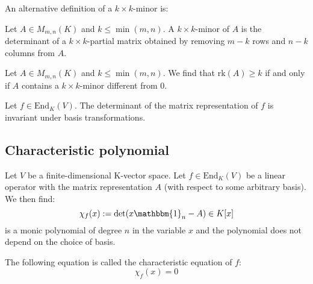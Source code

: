         An alternative definition of a $k\times k$-minor is: 
        \begin{definition}
		Let $A\in M_{m,n}(K)$ and $k\leq\min(m, n)$. A $k\times k$-minor of $A$ is the determinant of a $k\times k$-partial matrix obtained by removing $m-k$ rows and $n-k$ columns from $A$.
	\end{definition}
        \begin{theorem}
		Let $A\in M_{m,n}(K)$ and $k\leq\min(m, n)$. We find that $\text{rk}(A)\geq k$ if and only if $A$ contains a $k\times k$-minor different from 0.
	\end{theorem}
        
        \begin{theorem}
		Let $f\in \text{End}_K(V)$. The determinant of the matrix representation of $f$ is invariant under basis transformations.
	\end{theorem}
	

\subsection{Characteristic polynomial}

    	\begin{definition}\label{linalgebra:characteristic_polynomial}
		Let $V$ be a finite-dimensional K-vector space. Let $f\in \text{End}_K(V)$ be a linear operator with the matrix representation $A$ (with respect to some arbitrary basis). We then find:
		\begin{equation}
                	\chi_f(x) := \det(x\mathbbm{1}_n - A) \in K[x]
		\end{equation}
		is a monic polynomial of degree $n$ in the variable $x$ and the polynomial does not depend on the choice of basis.
	\end{definition}
        
        \begin{definition}
		The following equation is called the characteristic equation of $f$:
	        \begin{equation}
            		\label{linalgebra:characteristic_equation}
			\boxed{\chi_f(x) = 0}
		\end{equation}
	\end{definition}
        
